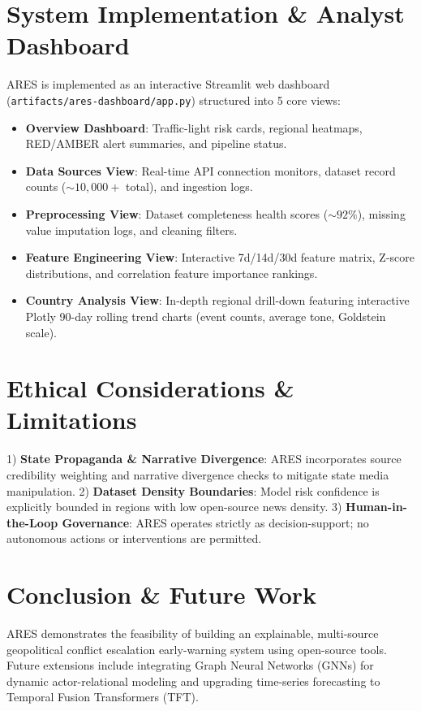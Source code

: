 \documentclass[conference]{IEEEtran}
\begin{document}
\section{System Implementation \& Analyst Dashboard}
ARES is implemented as an interactive Streamlit web dashboard (\texttt{artifacts/ares-dashboard/app.py}) structured into 5 core views:
\begin{itemize}
    \item \textbf{Overview Dashboard}: Traffic-light risk cards, regional heatmaps, RED/AMBER alert summaries, and pipeline status.
    \item \textbf{Data Sources View}: Real-time API connection monitors, dataset record counts ($\sim 10,000+$ total), and ingestion logs.
    \item \textbf{Preprocessing View}: Dataset completeness health scores ($\sim 92\%$), missing value imputation logs, and cleaning filters.
    \item \textbf{Feature Engineering View}: Interactive 7d/14d/30d feature matrix, Z-score distributions, and correlation feature importance rankings.
    \item \textbf{Country Analysis View}: In-depth regional drill-down featuring interactive Plotly 90-day rolling trend charts (event counts, average tone, Goldstein scale).
\end{itemize}

\section{Ethical Considerations \& Limitations}
1) \textbf{State Propaganda \& Narrative Divergence}: ARES incorporates source credibility weighting and narrative divergence checks to mitigate state media manipulation.
2) \textbf{Dataset Density Boundaries}: Model risk confidence is explicitly bounded in regions with low open-source news density.
3) \textbf{Human-in-the-Loop Governance}: ARES operates strictly as decision-support; no autonomous actions or interventions are permitted.

\section{Conclusion \& Future Work}
ARES demonstrates the feasibility of building an explainable, multi-source geopolitical conflict escalation early-warning system using open-source tools. Future extensions include integrating Graph Neural Networks (GNNs) for dynamic actor-relational modeling and upgrading time-series forecasting to Temporal Fusion Transformers (TFT).
\end{document}
